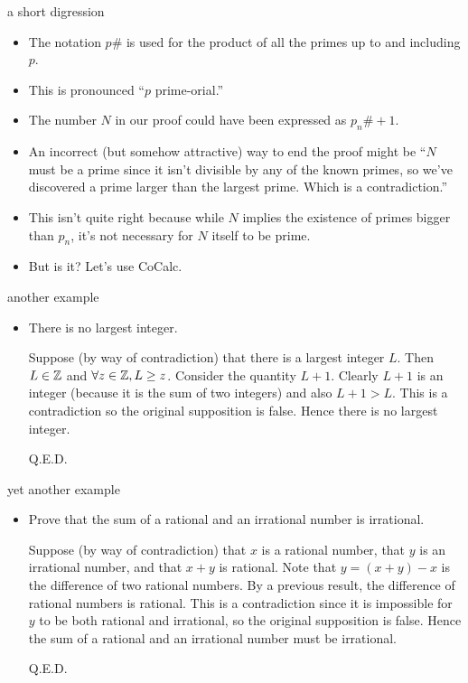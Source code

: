 \documentclass[landscape]{beamer}
\begin{document}
\begin{frame}{a short digression}
\begin{itemize}
\item The notation $p\#$ is used for the product of all the primes up to and including $p$. \pause
\item This is pronounced ``$p$ prime-orial.'' \pause
\item The number $N$ in our proof could have been expressed as $p_n\# + 1$. \pause
\item An incorrect (but somehow attractive) way to end the proof might be ``$N$ must be a prime since it isn't divisible by any of the known primes, so we've discovered a prime larger than the largest prime.  Which is a contradiction.'' \pause
\item This isn't quite right because while $N$ implies the existence of primes bigger than $p_n$, it's not necessary for $N$ itself to be prime. \pause
\item But is it? \pause Let's use CoCalc.
\end{itemize}
\end{frame}

\begin{frame}{another example}
\begin{itemize}
\item  There is no largest integer. \pause


Suppose (by way of contradiction) that there is a largest integer $L$.   
Then $L \in {\mathbb Z}$ and $\forall z \in {\mathbb Z}, L \geq z$.
Consider the quantity $L+1$.  Clearly $L+1$ is an integer (because it is the sum of two integers) and also
$L+1 > L$.   This is a contradiction so the original supposition is false.   Hence there is no largest integer.

\hspace{\fill} Q.E.D.

\end{itemize}
\end{frame}

\begin{frame}{yet another example}
\begin{itemize}
\item  Prove that the sum of a rational and an irrational 
number is irrational.\pause


\noindent Suppose (by way of contradiction) that $x$ is a rational number, that $y$ is an irrational number, and that $x+y$ is rational. 
Note that $y = (x+y) - x$ is the difference of two rational numbers.  By a previous result, the difference of rational numbers is rational. This is a contradiction since it is impossible for $y$ to be both rational and irrational, so the original supposition is false.   Hence the sum of a rational and an irrational 
number must be irrational.

\hspace{\fill} Q.E.D.


\end{itemize}
\end{frame}
\end{document}
